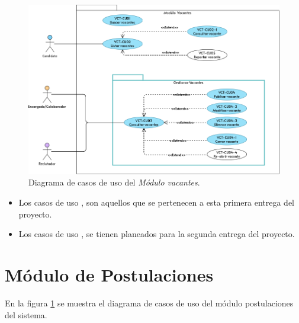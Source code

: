 	\begin{figure}[hbtp!]
		\begin{center}
			\includegraphics[width=.8\textwidth]{sprints/imagenes/MUVCT.png}
		\end{center}
		
		\caption{Diagrama de casos de uso del \textit{Módulo vacantes}.}
		\label{adcu:usr}
	\end{figure}

	\begin{itemize}
        \item Los casos de uso \IUazul{} , son aquellos que se pertenecen a esta primera entrega del proyecto.
        \item Los casos de uso \IUblanco{}, se tienen planeados para la segunda entrega del proyecto.
    \end{itemize} 

	
	

	
	

	
	

	
	

	
	
	


	\section{Módulo de Postulaciones}
	En la figura \ref{adcu:usr} se muestra el diagrama de casos de uso del módulo postulaciones del sistema.

